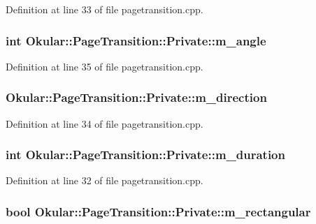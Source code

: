 Definition at line 33 of file pagetransition.\+cpp.

\hypertarget{classPageTransition_1_1Private_ae6054c8e811229d993f92ff283568ed9}{
\subsubsection[{m\+\_\+angle}]{\setlength{\rightskip}{0pt plus 5cm}int Okular\+::\+Page\+Transition\+::\+Private\+::m\+\_\+angle}}\label{classPageTransition_1_1Private_ae6054c8e811229d993f92ff283568ed9}


Definition at line 35 of file pagetransition.\+cpp.

\hypertarget{classPageTransition_1_1Private_a5c9571d2d2a7c7702a63c8ae4608f107}{
\subsubsection[{m\+\_\+direction}]{ Okular\+::\+Page\+Transition\+::\+Private\+::m\+\_\+direction}}\label{classPageTransition_1_1Private_a5c9571d2d2a7c7702a63c8ae4608f107}


Definition at line 34 of file pagetransition.\+cpp.

\hypertarget{classPageTransition_1_1Private_ade23bff4fd8086b8fa470c3288ed4559}{
\subsubsection[{m\+\_\+duration}]{\setlength{\rightskip}{0pt plus 5cm}int Okular\+::\+Page\+Transition\+::\+Private\+::m\+\_\+duration}}\label{classPageTransition_1_1Private_ade23bff4fd8086b8fa470c3288ed4559}


Definition at line 32 of file pagetransition.\+cpp.

\hypertarget{classPageTransition_1_1Private_ac9c3701391aeb80a7983a71a6eb82c54}{
\subsubsection[{m\+\_\+rectangular}]{\setlength{\rightskip}{0pt plus 5cm}bool Okular\+::\+Page\+Transition\+::\+Private\+::m\+\_\+rectangular}}\label{classPageTransition_1_1Private_ac9c3701391aeb80a7983a71a6eb82c54}


